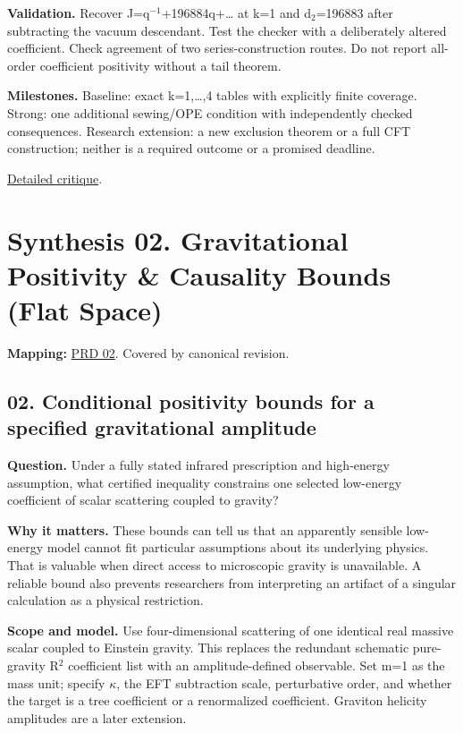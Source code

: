 \documentclass[
  11pt,
]{article}
\begin{document}
\textbf{Validation.} Recover J=q\ensuremath{{}^{-1}}+196884q+… at k=1
and d\ensuremath{{}_{2}}=196883 after subtracting the vacuum descendant.
Test the checker with a deliberately altered coefficient. Check
agreement of two series-construction routes. Do not report all-order
coefficient positivity without a tail theorem.

\textbf{Milestones.} Baseline: exact k=1,\ldots,4 tables with explicitly
finite coverage. Strong: one additional sewing/OPE condition with
independently checked consequences. Research extension: a new exclusion
theorem or a full CFT construction; neither is a required outcome or a
promised deadline.

\href{https://github.com/rick-stevens-ai/Pure-Thought/blob/main/reviews/01-AdS3-Modular-Bootstrap.md}{Detailed
critique}.

\section{Synthesis 02. Gravitational Positivity \& Causality Bounds
(Flat Space)}

\textbf{Mapping:}
\href{https://github.com/rick-stevens-ai/Pure-Thought/blob/main/PRDs/02-Gravitational-Positivity-Bounds.md}{PRD
02}. Covered by canonical revision.

\subsection{02. Conditional positivity bounds for a specified
gravitational amplitude}

\textbf{Question.} Under a fully stated infrared prescription and
high-energy assumption, what certified inequality constrains one
selected low-energy coefficient of scalar scattering coupled to gravity?

\textbf{Why it matters.} These bounds can tell us that an apparently
sensible low-energy model cannot fit particular assumptions about its
underlying physics. That is valuable when direct access to microscopic
gravity is unavailable. A reliable bound also prevents researchers from
interpreting an artifact of a singular calculation as a physical
restriction.

\textbf{Scope and model.} Use four-dimensional scattering of one
identical real massive scalar coupled to Einstein gravity. This replaces
the redundant schematic pure-gravity R\ensuremath{{}^{2}} coefficient
list with an amplitude-defined observable. Set m=1 as the mass unit;
specify \ensuremath{\kappa}, the EFT subtraction scale, perturbative
order, and whether the target is a tree coefficient or a renormalized
coefficient. Graviton helicity amplitudes are a later extension.
\end{document}
